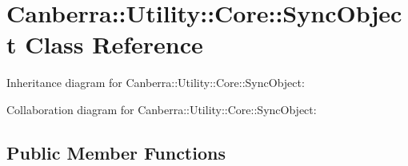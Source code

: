 \hypertarget{class_canberra_1_1_utility_1_1_core_1_1_sync_object}{}\section{Canberra\+:\+:Utility\+:\+:Core\+:\+:Sync\+Object Class Reference}
\label{class_canberra_1_1_utility_1_1_core_1_1_sync_object}


Inheritance diagram for Canberra\+:\+:Utility\+:\+:Core\+:\+:Sync\+Object\+:


Collaboration diagram for Canberra\+:\+:Utility\+:\+:Core\+:\+:Sync\+Object\+:
\subsection*{Public Member Functions}
